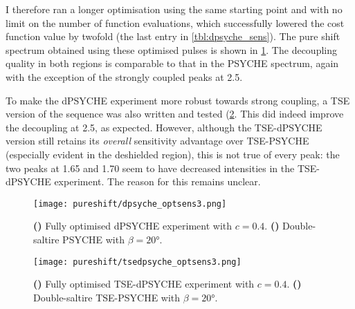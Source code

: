 I therefore ran a longer optimisation using the same starting point and with no limit on the number of function evaluations, which successfully lowered the cost function value by twofold (the last entry in \cref{tbl:dpsyche_sens}).
The pure shift spectrum obtained using these optimised pulses is shown in \cref{fig:dpsyche_optsens3}.
The decoupling quality in both regions is comparable to that in the PSYCHE spectrum, again with the exception of the strongly coupled peaks at \SI{2.5}{\ppm}.

To make the dPSYCHE experiment more robust towards strong coupling, a TSE version of the sequence was also written and tested (\cref{fig:tsedpsyche_optsens3}.
This did indeed improve the decoupling at \SI{2.5}{\ppm}, as expected.
However, although the TSE-dPSYCHE version still retains its \textit{overall} sensitivity advantage over TSE-PSYCHE (especially evident in the deshielded region), this is not true of every peak: the two peaks at 1.65 and \SI{1.70}{\ppm} seem to have decreased intensities in the TSE-dPSYCHE experiment.
The reason for this remains unclear.

\begin{figure}[htb]
    \centering
    \texttt{[image: pureshift/dpsyche\_optsens3.png]}
    {\label{fig:dpsyche_optsens3_d}}
    {\label{fig:dpsyche_optsens3_p}}
    \caption[dPSYCHE final optimisation with $c = 0.4$]{
        \textbf{()} Fully optimised dPSYCHE experiment with $c = 0.4$.
        \textbf{()} Double-saltire PSYCHE with $\beta = \ang{20}$.
    }
    \label{fig:dpsyche_optsens3}
\end{figure}

\begin{figure}[htb]
    \centering
    \texttt{[image: pureshift/tsedpsyche\_optsens3.png]}
    {\label{fig:tsedpsyche_optsens3_d}}
    {\label{fig:tsedpsyche_optsens3_p}}
    \caption[TSE-dPSYCHE final optimisation with $c = 0.4$]{
        \textbf{()} Fully optimised TSE-dPSYCHE experiment with $c = 0.4$.
        \textbf{()} Double-saltire TSE-PSYCHE with $\beta = \ang{20}$.
    }
    \label{fig:tsedpsyche_optsens3}
\end{figure}


